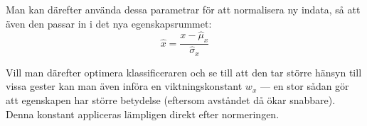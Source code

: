 \documentclass[../rapport_MVEX01-11-05]{subfiles}
\begin{document}
Man kan därefter använda dessa parametrar för att normalisera ny indata, så
att även den passar in i det nya egenskapsrummet:
\begin{equation*}
	\hat{x} = \frac{x - \hat\mu_x}{\hat\sigma_x}
\end{equation*}

Vill man därefter optimera klassificeraren och se till att den tar större hänsyn
till vissa gester kan man även införa en viktningskonstant $w_x$ --- en stor
sådan gör att egenskapen har större betydelse (eftersom avståndet då ökar
snabbare). Denna konstant appliceras lämpligen direkt efter normeringen.
\end{document}
